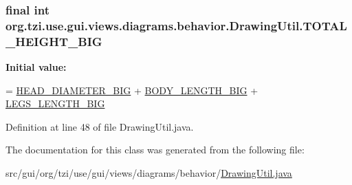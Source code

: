\hypertarget{classorg_1_1tzi_1_1use_1_1gui_1_1views_1_1diagrams_1_1behavior_1_1_drawing_util_adce67daaab8246dc8f8ee1a84dbc734b}{
\subsubsection[{T\-O\-T\-A\-L\-\_\-\-H\-E\-I\-G\-H\-T\-\_\-\-B\-I\-G}]{\setlength{\rightskip}{0pt plus 5cm}final int org.\-tzi.\-use.\-gui.\-views.\-diagrams.\-behavior.\-Drawing\-Util.\-T\-O\-T\-A\-L\-\_\-\-H\-E\-I\-G\-H\-T\-\_\-\-B\-I\-G\hspace{0.3cm}{\ttfamily [static]}}}\label{classorg_1_1tzi_1_1use_1_1gui_1_1views_1_1diagrams_1_1behavior_1_1_drawing_util_adce67daaab8246dc8f8ee1a84dbc734b}
{\bfseries Initial value\-:}
\begin{DoxyCode}
= \hyperlink{classorg_1_1tzi_1_1use_1_1gui_1_1views_1_1diagrams_1_1behavior_1_1_drawing_util_a0a63e4308bf6684e43e397820ee3b3a1}{HEAD\_DIAMETER\_BIG}
            + \hyperlink{classorg_1_1tzi_1_1use_1_1gui_1_1views_1_1diagrams_1_1behavior_1_1_drawing_util_a3367022a56cefd4b82efa24b52586fc0}{BODY\_LENGTH\_BIG} + \hyperlink{classorg_1_1tzi_1_1use_1_1gui_1_1views_1_1diagrams_1_1behavior_1_1_drawing_util_a2775f422574ad3c37cb1ae254449ffaf}{LEGS\_LENGTH\_BIG}
\end{DoxyCode}


Definition at line 48 of file Drawing\-Util.\-java.



The documentation for this class was generated from the following file\-:\begin{DoxyCompactItemize}
\item 
src/gui/org/tzi/use/gui/views/diagrams/behavior/\hyperlink{_drawing_util_8java}{Drawing\-Util.\-java}\end{DoxyCompactItemize}
